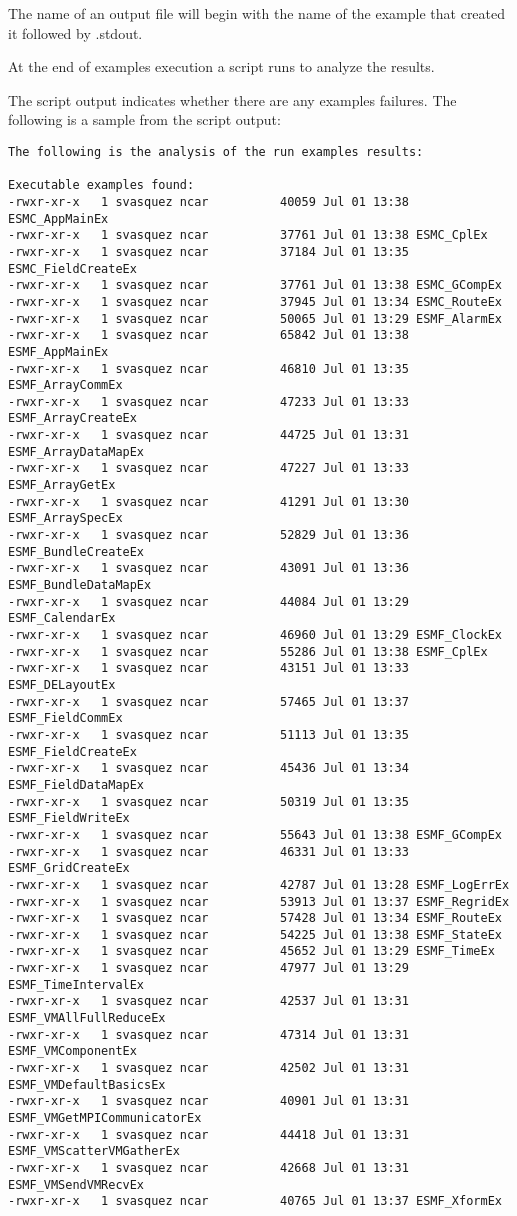 The name of an output file will begin with the name of the example
that created it followed by .stdout.

At the end of examples execution a script runs to analyze the results.

The script output indicates whether there are any examples failures.
The following is a sample from the script output:

\begin{verbatim}
The following is the analysis of the run examples results:

Executable examples found:
-rwxr-xr-x   1 svasquez ncar          40059 Jul 01 13:38 ESMC_AppMainEx
-rwxr-xr-x   1 svasquez ncar          37761 Jul 01 13:38 ESMC_CplEx
-rwxr-xr-x   1 svasquez ncar          37184 Jul 01 13:35 ESMC_FieldCreateEx
-rwxr-xr-x   1 svasquez ncar          37761 Jul 01 13:38 ESMC_GCompEx
-rwxr-xr-x   1 svasquez ncar          37945 Jul 01 13:34 ESMC_RouteEx
-rwxr-xr-x   1 svasquez ncar          50065 Jul 01 13:29 ESMF_AlarmEx
-rwxr-xr-x   1 svasquez ncar          65842 Jul 01 13:38 ESMF_AppMainEx
-rwxr-xr-x   1 svasquez ncar          46810 Jul 01 13:35 ESMF_ArrayCommEx
-rwxr-xr-x   1 svasquez ncar          47233 Jul 01 13:33 ESMF_ArrayCreateEx
-rwxr-xr-x   1 svasquez ncar          44725 Jul 01 13:31 ESMF_ArrayDataMapEx
-rwxr-xr-x   1 svasquez ncar          47227 Jul 01 13:33 ESMF_ArrayGetEx
-rwxr-xr-x   1 svasquez ncar          41291 Jul 01 13:30 ESMF_ArraySpecEx
-rwxr-xr-x   1 svasquez ncar          52829 Jul 01 13:36 ESMF_BundleCreateEx
-rwxr-xr-x   1 svasquez ncar          43091 Jul 01 13:36 ESMF_BundleDataMapEx
-rwxr-xr-x   1 svasquez ncar          44084 Jul 01 13:29 ESMF_CalendarEx
-rwxr-xr-x   1 svasquez ncar          46960 Jul 01 13:29 ESMF_ClockEx
-rwxr-xr-x   1 svasquez ncar          55286 Jul 01 13:38 ESMF_CplEx
-rwxr-xr-x   1 svasquez ncar          43151 Jul 01 13:33 ESMF_DELayoutEx
-rwxr-xr-x   1 svasquez ncar          57465 Jul 01 13:37 ESMF_FieldCommEx
-rwxr-xr-x   1 svasquez ncar          51113 Jul 01 13:35 ESMF_FieldCreateEx
-rwxr-xr-x   1 svasquez ncar          45436 Jul 01 13:34 ESMF_FieldDataMapEx
-rwxr-xr-x   1 svasquez ncar          50319 Jul 01 13:35 ESMF_FieldWriteEx
-rwxr-xr-x   1 svasquez ncar          55643 Jul 01 13:38 ESMF_GCompEx
-rwxr-xr-x   1 svasquez ncar          46331 Jul 01 13:33 ESMF_GridCreateEx
-rwxr-xr-x   1 svasquez ncar          42787 Jul 01 13:28 ESMF_LogErrEx
-rwxr-xr-x   1 svasquez ncar          53913 Jul 01 13:37 ESMF_RegridEx
-rwxr-xr-x   1 svasquez ncar          57428 Jul 01 13:34 ESMF_RouteEx
-rwxr-xr-x   1 svasquez ncar          54225 Jul 01 13:38 ESMF_StateEx
-rwxr-xr-x   1 svasquez ncar          45652 Jul 01 13:29 ESMF_TimeEx
-rwxr-xr-x   1 svasquez ncar          47977 Jul 01 13:29 ESMF_TimeIntervalEx
-rwxr-xr-x   1 svasquez ncar          42537 Jul 01 13:31 ESMF_VMAllFullReduceEx
-rwxr-xr-x   1 svasquez ncar          47314 Jul 01 13:31 ESMF_VMComponentEx
-rwxr-xr-x   1 svasquez ncar          42502 Jul 01 13:31 ESMF_VMDefaultBasicsEx
-rwxr-xr-x   1 svasquez ncar          40901 Jul 01 13:31 ESMF_VMGetMPICommunicatorEx
-rwxr-xr-x   1 svasquez ncar          44418 Jul 01 13:31 ESMF_VMScatterVMGatherEx
-rwxr-xr-x   1 svasquez ncar          42668 Jul 01 13:31 ESMF_VMSendVMRecvEx
-rwxr-xr-x   1 svasquez ncar          40765 Jul 01 13:37 ESMF_XformEx


\end{verbatim}
